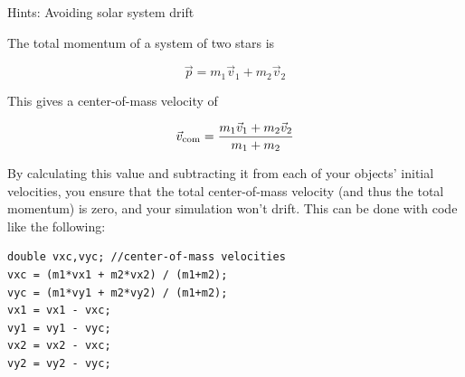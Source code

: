 \documentclass[12pt]{article}
\begin{document}
\newpage

\bigskip
\bigskip

\begin{center}
\Large Hints: Avoiding solar system drift
\end{center}

\normalsize

The total momentum of a system of two stars is

$$
\vec p =m_1 \vec v_1 + m_2 \vec v_2
$$

This gives a center-of-mass velocity of 

$$\vec v_{\rm com} = \frac{m_1 \vec v_1 + m_2 \vec v_2}{m_1+m_2}$$

By calculating this value and subtracting it from each of your objects' initial velocities,
you ensure that the total center-of-mass velocity (and thus the total momentum) is zero,
and your simulation won't drift. This can be done with code like the following:

\begin{verbatim}
double vxc,vyc; //center-of-mass velocities
vxc = (m1*vx1 + m2*vx2) / (m1+m2); 
vyc = (m1*vy1 + m2*vy2) / (m1+m2); 
vx1 = vx1 - vxc;
vy1 = vy1 - vyc;
vx2 = vx2 - vxc;
vy2 = vy2 - vyc;
\end{verbatim}
\end{document}
